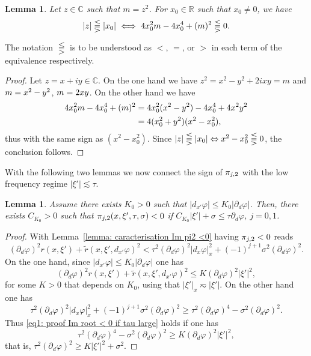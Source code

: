 \documentclass[10pt]{amsart}
\theoremstyle{plain}
\newtheorem{lemma}[theorem]{Lemma}
\theoremstyle{definition}
\def\R{\mathbb{R}}
\def\C{\mathbb{C}}
\let \Re \relax
\DeclareMathOperator{\Re}{Re}
\let \Im \relax
\DeclareMathOperator{\Im}{Im}
\begin{document}
\begin{lemma}
\label{lem1}
Let $z\in\C$ such that $m=z^2$. For $x_0\in\R$ such
that $x_0\neq 0$, we have
\begin{equation*}
|\Re z|\lesseqqgtr |x_0|
\iff
4x_0^2 \Re m-4x_0^4+(\Im m)^2
\lesseqqgtr0.
\end{equation*}
\end{lemma}
The notation $\lesseqqgtr$ is to be understood as $<$, $=$, or $>$
in each term of the equivalence respectively.
\begin{proof}
Let $z=x+iy\in\C$. On the one hand we have
$z^2=x^2-y^2+2ixy=m$ and $\Re m=x^2-y^2$, $\Im m=2xy$. On the other
hand we have
\begin{align*}
4x_0^2\Re m-4x_0^4+(\Im m)^2
&=4x_0^2(x^2-y^2)-4x_0^4+4x^2y^2\\
&=4(x_0^2+y^2)(x^2-x_0^2),
\end{align*}
thus with the same sign as $(x^2-x_0^2)$.
Since $|\Re z|\lesseqqgtr |x_0| \Leftrightarrow x^2-x_0^2 \lesseqqgtr 0$, the conclusion follows.
\end{proof}

With the following two lemmas we now connect the sign of $\Im \pi_{j,2}$ with the low frequency
regime $|\xi'| \lesssim \tau$.

\begin{lemma}
\label{lemma: Im root < 0 if tau large}
Assume there exists $K_0 >0$ such that $|d_{x'} \varphi| \leq K_0 |\partial_d
\varphi|$. Then, there exists $C_{K_0}>0$ such that $\Im \pi_{j,2} (x,\xi',\tau,\sigma) <0$
if $C_{K_0} |\xi'| + \sigma \leq \tau \partial_d \varphi$, $j=0,1$.
\end{lemma}
\begin{proof}
With Lemma~\ref{lemma: caracterisation Im pi2 <0} having $\Im
\pi_{j,2} <0$ reads
\begin{equation}
\label{eq1: proof Im root < 0 if tau large}
(\partial_d\varphi)^2r(x,\xi')+\tilde{r}(x,\xi',d_{x'}\varphi)^2
<\tau^2(\partial_d\varphi)^2|d_x\varphi|_x^2+(-1)^{j+1}\sigma^2(\partial_d\varphi)^2.
\end{equation}
On the one hand, since $|d_{x'} \varphi| \leq K_0 |\partial_d
\varphi|$ one has
\begin{equation*}
(\partial_d\varphi)^2r(x,\xi')+\tilde{r}(x,\xi',d_{x'}\varphi)^2
\leq K (\partial_d\varphi)^2 |\xi'|^2,
\end{equation*}
for some $K>0$ that depends on $K_0$, using that $|\xi'|_x \eqsim
|\xi'|$.
On the other hand one has
\begin{equation*}
\tau^2(\partial_d\varphi)^2|d_x\varphi|_x^2+(-1)^{j+1}\sigma^2(\partial_d\varphi)^2
\geq \tau^2 (\partial_d\varphi)^4 - \sigma^2(\partial_d\varphi)^2.
\end{equation*}
Thus \eqref{eq1: proof Im root < 0 if tau large} holds if one has
\begin{equation*}
\tau^2 (\partial_d\varphi)^4
- \sigma^2(\partial_d\varphi)^2
\geq K (\partial_d\varphi)^2 |\xi'|^2,
\end{equation*}
that is, $\tau^2 (\partial_d\varphi)^2 \geq K |\xi'|^2
+ \sigma^2$.
\end{proof}
\end{document}
